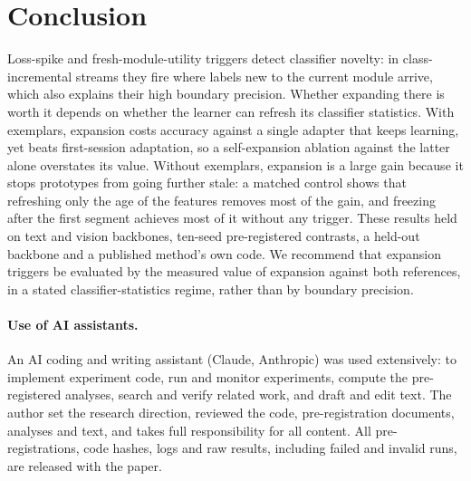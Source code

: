 \documentclass[10pt]{article}
\begin{document}
\section{Conclusion}
Loss-spike and fresh-module-utility triggers detect classifier novelty: in class-incremental streams they fire where labels new to the current module arrive, which also explains their high boundary precision. Whether expanding there is worth it depends on whether the learner can refresh its classifier statistics. With exemplars, expansion costs accuracy against a single adapter that keeps learning, yet beats first-session adaptation, so a self-expansion ablation against the latter alone overstates its value. Without exemplars, expansion is a large gain because it stops prototypes from going further stale: a matched control shows that refreshing only the age of the features removes most of the gain, and freezing after the first segment achieves most of it without any trigger. These results held on text and vision backbones, ten-seed pre-registered contrasts, a held-out backbone and a published method's own code. We recommend that expansion triggers be evaluated by the measured value of expansion against both references, in a stated classifier-statistics regime, rather than by boundary precision.

\paragraph{Use of AI assistants.} An AI coding and writing assistant (Claude, Anthropic) was used extensively: to implement experiment code, run and monitor experiments, compute the pre-registered analyses, search and verify related work, and draft and edit text. The author set the research direction, reviewed the code, pre-registration documents, analyses and text, and takes full responsibility for all content. All pre-registrations, code hashes, logs and raw results, including failed and invalid runs, are released with the paper.




\appendix

\end{document}
